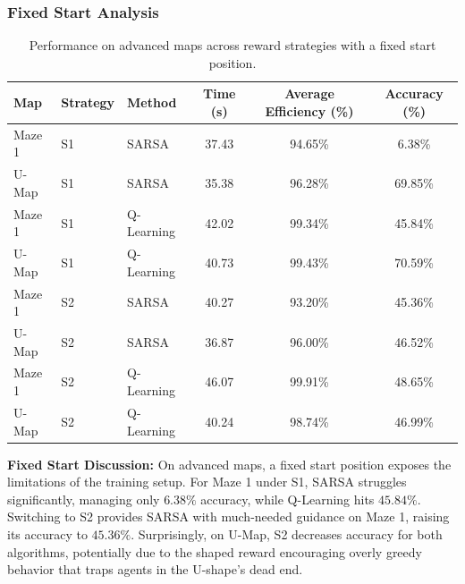 \documentclass{article}
\begin{document}
\subsubsection{Fixed Start Analysis}
\begin{table}[H]
\centering
\begin{tabular}{lllccc}
\toprule
\textbf{Map} & \textbf{Strategy} & \textbf{Method} & \textbf{Time (s)} & \textbf{Average Efficiency (\%)} & \textbf{Accuracy (\%)} \\ \midrule
Maze 1 & S1 & SARSA       & 37.43 & 94.65\% & 6.38\% \\
U-Map  & S1 & SARSA       & 35.38 & 96.28\% & 69.85\% \\
Maze 1 & S1 & Q-Learning  & 42.02 & 99.34\% & 45.84\% \\
U-Map  & S1 & Q-Learning  & 40.73 & 99.43\% & 70.59\% \\
Maze 1 & S2 & SARSA       & 40.27 & 93.20\% & 45.36\% \\
U-Map  & S2 & SARSA       & 36.87 & 96.00\% & 46.52\% \\
Maze 1 & S2 & Q-Learning  & 46.07 & 99.91\% & 48.65\% \\
U-Map  & S2 & Q-Learning  & 40.24 & 98.74\% & 46.99\% \\ \bottomrule
\end{tabular}
\caption{Performance on advanced maps across reward strategies with a fixed start position.}
\end{table}

\textbf{Fixed Start Discussion:} On advanced maps, a fixed start position exposes the limitations of the training setup. For Maze 1 under S1, SARSA struggles significantly, managing only $6.38\%$ accuracy, while Q-Learning hits $45.84\%$. Switching to S2 provides SARSA with much-needed guidance on Maze 1, raising its accuracy to $45.36\%$. Surprisingly, on U-Map, S2 decreases accuracy for both algorithms, potentially due to the shaped reward encouraging overly greedy behavior that traps agents in the U-shape's dead end.
\end{document}
